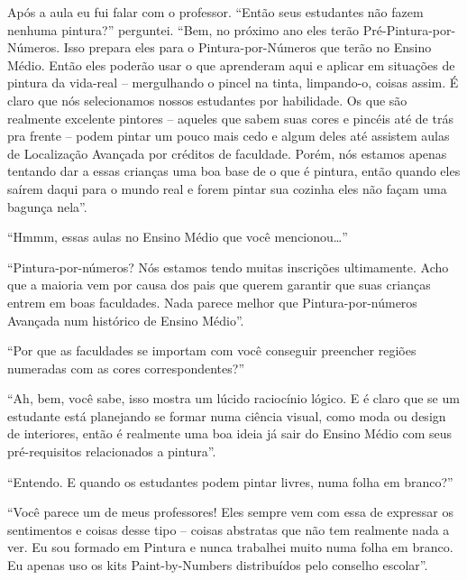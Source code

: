 \documentclass[a4paper,oneside,12pt,notitlepage]{article}
\begin{document}
Após a aula eu fui falar com o professor.
``Então seus estudantes não fazem nenhuma pintura?''
perguntei.
``Bem, no próximo ano eles terão Pré-Pintura-por-Números.
Isso prepara eles para o Pintura-por-Números que terão no Ensino Médio.
Então eles poderão usar o que aprenderam aqui e aplicar em situações de pintura da vida-real -- mergulhando o pincel na tinta, limpando-o, coisas assim.
É claro que nós selecionamos nossos estudantes por habilidade.
Os que são realmente excelente pintores -- aqueles que sabem suas cores e pincéis até de trás pra frente -- podem pintar um pouco mais cedo e algum deles até assistem aulas de Localização Avançada por créditos de faculdade.
Porém, nós estamos apenas tentando dar a essas crianças uma boa base de o que é pintura, então quando eles saírem daqui para o mundo real e forem pintar sua cozinha eles não façam uma bagunça nela''.

``Hmmm, essas aulas no Ensino Médio que você mencionou\ldots{}''

``Pintura-por-números?
Nós estamos tendo muitas inscrições ultimamente.
Acho que a maioria vem por causa dos pais que querem garantir que suas crianças entrem em boas faculdades.
Nada parece melhor que Pintura-por-números Avançada num histórico de Ensino Médio''.

``Por que as faculdades se importam com você conseguir preencher regiões numeradas com as cores correspondentes?''

``Ah, bem, você sabe, isso mostra um lúcido raciocínio lógico.
E é claro que se um estudante está planejando se formar numa ciência visual, como moda ou design de interiores, então é realmente uma boa ideia já sair do Ensino Médio com seus pré-requisitos relacionados a pintura''.

``Entendo.
E quando os estudantes podem pintar livres, numa folha em branco?''

``Você parece um de meus professores!
Eles sempre vem com essa de expressar os sentimentos e coisas desse tipo -- coisas abstratas que não tem realmente nada a ver.
Eu sou formado em Pintura e nunca trabalhei muito numa folha em branco.
Eu apenas uso os kits Paint-by-Numbers distribuídos pelo conselho escolar''.
\end{document}
